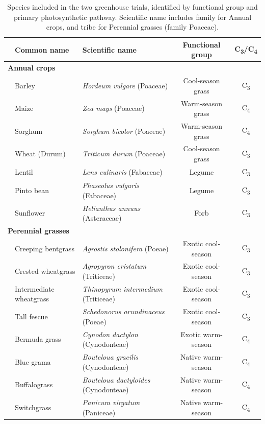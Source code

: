 \documentclass{svjour3}
\begin{document}
\begin{table}[]
\centering
\begin{tabular}{@{}lllcc@{}}
\toprule
  & Common name & Scientific name   &  Functional group &  C\textsubscript{3}/C\textsubscript{4} \\ \midrule
 \multicolumn{5}{l}{\bfseries Annual crops} \\
  & Barley  &  \emph{Hordeum vulgare} (Poaceae)  & Cool-season grass & C\textsubscript{3}  \\
  & Maize  &  \emph{Zea mays} (Poaceae)  & Warm-season grass & C\textsubscript{4}  \\
   & Sorghum  &  \emph{Sorghum bicolor} (Poaceae)  & Warm-season grass & C\textsubscript{4}  \\
  & Wheat (Durum) &  \emph{Triticum durum} (Poaceae)  & Cool-season grass & C\textsubscript{3}  \\
   & Lentil  &  \emph{Lens culinaris} (Fabaceae)  & Legume & C\textsubscript{3}  \\
  & Pinto bean  &  \emph{Phaseolus vulgaris} (Fabaceae)  & Legume & C\textsubscript{3}  \\
   & Sunflower  &  \emph{Helianthus annuus} (Asteraceae)  & Forb & C\textsubscript{3}  \\\midrule
 \multicolumn{5}{l}{\bfseries Perennial grasses} \\ 
  & Creeping bentgrass &  \emph{Agrostis stolonifera} (Poeae)  & Exotic cool-season & C\textsubscript{3}  \\
    & Crested wheatgrass &  \emph{Agropyron cristatum} (Triticeae)  & Exotic cool-season  & C\textsubscript{3}  \\
   & Intermediate wheatgrass &  \emph{Thinopyrum intermedium} (Triticeae)  & Exotic cool-season & C\textsubscript{3}  \\
   & Tall fescue &  \emph{Schedonorus arundinaceus} (Poeae)  & Exotic cool-season  & C\textsubscript{3}  \\
  & Bermuda grass  &  \emph{Cynodon dactylon} (Cynodonteae)  & Exotic warm-season  & C\textsubscript{4}  \\
 & Blue grama  &  \emph{Bouteloua gracilis} (Cynodonteae)  & Native warm-season & C\textsubscript{4}  \\
  & Buffalograss  &  \emph{Bouteloua dactyloides} (Cynodonteae)  & Native warm-season & C\textsubscript{4}  \\
  & Switchgrass &  \emph{Panicum virgatum} (Paniceae)  & Native warm-season  & C\textsubscript{4}  \\
\bottomrule
\end{tabular}
\caption{Species included in the two greenhouse trials, identified by functional group and primary photosynthetic pathway. 
Scientific name includes family for Annual crops, and tribe for Perennial grasses (family Poaceae). }
\label{tab:spp}
\end{table}
\end{document}
